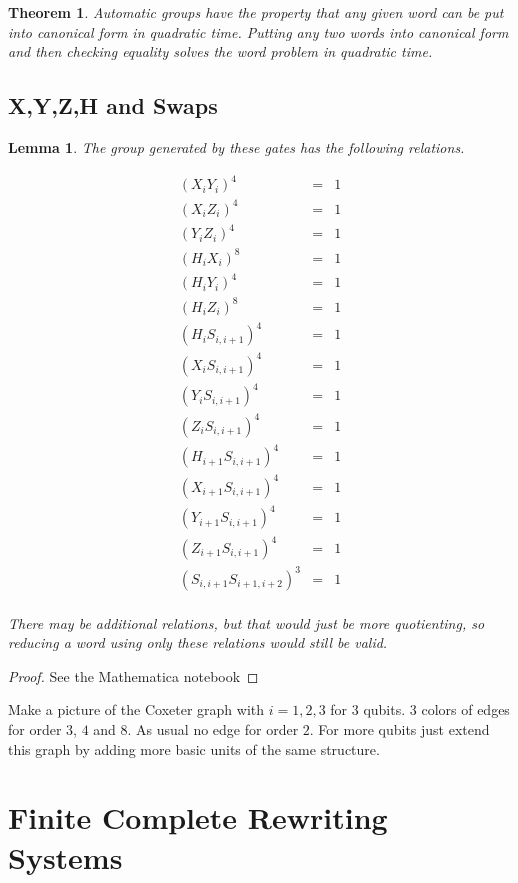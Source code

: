 \documentclass[11pt]{article}
\theoremstyle{change}
\newtheorem{theorem}[equation]{Theorem}
\newtheorem{lemma}[equation]{Lemma}
\theoremstyle{nonumberplain}
\newtheorem{proof}{Proof}
\numberwithin{equation}{section}
\begin{document}
\begin{theorem}
Automatic groups have the property that any given word can be put into canonical form in quadratic time. Putting any two words into canonical form and then checking equality solves the word problem in quadratic time.
\end{theorem}

\subsection{X,Y,Z,H and Swaps}

\begin{lemma}
The group generated by these gates has the following relations.

\begin{eqnarray*}
( X_i Y_i )^4 &=& 1\\
( X_i Z_i )^4 &=& 1\\
( Y_i Z_i )^4 &=& 1\\
( H_i X_i )^8 &=& 1\\
( H_i Y_i )^4 &=& 1\\
( H_i Z_i )^8 &=& 1\\
(H_i S_{i,i+1})^4 &=& 1\\
(X_i S_{i,i+1})^4 &=& 1\\
(Y_i S_{i,i+1})^4 &=& 1\\
(Z_i S_{i,i+1})^4 &=& 1\\
(H_{i+1} S_{i,i+1})^4 &=& 1\\
(X_{i+1} S_{i,i+1})^4 &=& 1\\
(Y_{i+1} S_{i,i+1})^4 &=& 1\\
(Z_{i+1} S_{i,i+1})^4 &=& 1\\
(S_{i,i+1} S_{i+1,i+2})^3 &=& 1\\
\end{eqnarray*}

There may be additional relations, but that would just be more quotienting, so reducing a word using only these relations would still be valid.
\end{lemma}

\begin{proof}
See the Mathematica notebook
\end{proof}

Make a picture of the Coxeter graph with $i=1,2,3$ for 3 qubits. 3 colors of edges for order $3$, $4$ and $8$. As usual no edge for order $2$. For more qubits just extend this graph by adding more basic units of the same structure.

\section{Finite Complete Rewriting Systems}
\end{document}
